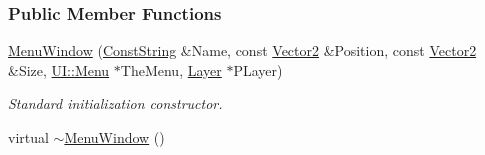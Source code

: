 \subsubsection*{Public Member Functions}
\begin{DoxyCompactItemize}
\item 
\hyperlink{classphys_1_1UI_1_1MenuWindow_a85f79c6bde9f8ccfbb52f853f58a0f3f}{MenuWindow} (\hyperlink{namespacephys_a5ce5049f8b4bf88d6413c47b504ebb31}{ConstString} \&Name, const \hyperlink{classphys_1_1Vector2}{Vector2} \&Position, const \hyperlink{classphys_1_1Vector2}{Vector2} \&Size, \hyperlink{classphys_1_1UI_1_1Menu}{UI::Menu} $\ast$TheMenu, \hyperlink{classphys_1_1UI_1_1Layer}{Layer} $\ast$PLayer)
\begin{DoxyCompactList}\small\item\em Standard initialization constructor. \item\end{DoxyCompactList}\item 
\hypertarget{classphys_1_1UI_1_1MenuWindow_a8de1eab7a7897e24dfb722cce7d903eb}{
virtual \hyperlink{classphys_1_1UI_1_1MenuWindow_a8de1eab7a7897e24dfb722cce7d903eb}{$\sim$MenuWindow} ()}
\label{classphys_1_1UI_1_1MenuWindow_a8de1eab7a7897e24dfb722cce7d903eb}


\end{DoxyCompactItemize}
